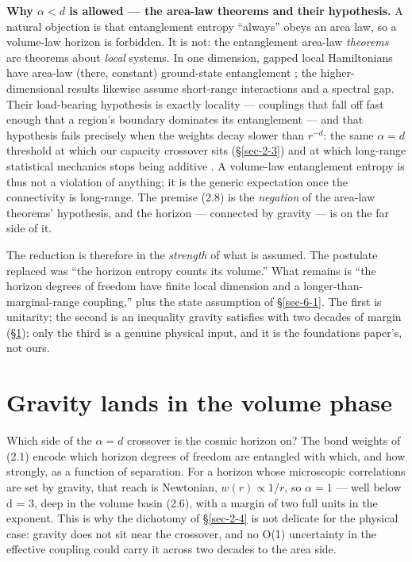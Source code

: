 \documentclass[aps,prd,preprint,nofootinbib,superscriptaddress]{revtex4-2}
\begin{document}
\textbf{Why \(\alpha  < d\) is allowed --- the area-law theorems and
their hypothesis.} A natural objection is that entanglement entropy
``always'' obeys an area law, so a volume-law horizon is forbidden. It
is not: the entanglement area-law \emph{theorems} are theorems about
\emph{local} systems. In one dimension, gapped local Hamiltonians have
area-law (there, constant) ground-state entanglement
\citep{Hastings:2007iok}; the higher-dimensional results
\citep{Brandao:2013fpa} likewise assume short-range interactions and a
spectral gap. Their load-bearing hypothesis is exactly locality ---
couplings that fall off fast enough that a region's boundary dominates
its entanglement --- and that hypothesis fails precisely when the
weights decay slower than \(r^{-d}\): the same \(\alpha  = d\) threshold
at which our capacity crossover sits (§\ref{sec-2-3}) and at which
long-range statistical mechanics stops being additive
\citep{Campa:2009jxa}. A volume-law entanglement entropy is thus not a
violation of anything; it is the generic expectation once the
connectivity is long-range. The premise (2.8) is the \emph{negation} of
the area-law theorems' hypothesis, and the horizon --- connected by
gravity --- is on the far side of it.

The reduction is therefore in the \emph{strength} of what is assumed.
The postulate replaced was ``the horizon entropy counts its volume.''
What remains is ``the horizon degrees of freedom have finite local
dimension and a longer-than-marginal-range coupling,'' plus the state
assumption of §\ref{sec-6-1}. The first is unitarity; the second is an
inequality gravity satisfies with two decades of margin (§\ref{sec-4});
only the third is a genuine physical input, and it is the foundations
paper's, not ours.

\section{Gravity lands in the volume phase}\label{sec-4}

Which side of the \(\alpha  = d\) crossover is the cosmic horizon on?
The bond weights of (2.1) encode which horizon degrees of freedom are
entangled with which, and how strongly, as a function of separation. For
a horizon whose microscopic correlations are set by gravity, that reach
is Newtonian, \(w(r) \propto  1/r\), so \(\alpha  = 1\) --- well below d
= 3, deep in the volume basin (2.6), with a margin of two full units in
the exponent. This is why the dichotomy of §\ref{sec-2-4} is not
delicate for the physical case: gravity does not sit near the crossover,
and no O(1) uncertainty in the effective coupling could carry it across
two decades to the area side.
\end{document}
